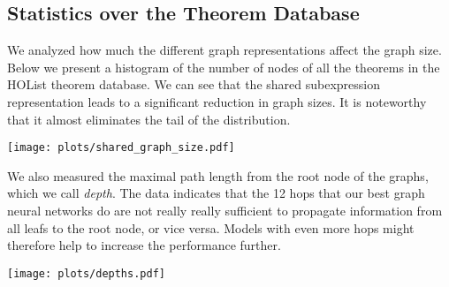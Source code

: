 \documentclass[letterpaper]{article} \usepackage{aaai20}  \usepackage{times}  \usepackage{helvet} \usepackage{courier}  \usepackage[hyphens]{url}  \usepackage{graphicx} \urlstyle{rm} \def\UrlFont{\rm}  \usepackage{graphicx}  \frenchspacing  \setlength{\pdfpagewidth}{8.5in}  \setlength{\pdfpageheight}{11in}
\begin{document}
\subsection{Statistics over the Theorem Database}
\label{sec:graph-stats}

We analyzed how much the different graph representations affect the graph size. 
Below we present a histogram of the number of nodes of all the theorems in the HOList theorem database. We can see that the shared subexpression representation leads to a significant reduction in graph sizes. It is noteworthy that it almost eliminates the tail of the distribution.

\texttt{[image: plots/shared\_graph\_size.pdf]}

We also measured the maximal path length from the root node of the graphs, which we call \emph{depth}.
The data indicates that the 12 hops that our best graph neural networks do are not really really sufficient to propagate information from all leafs to the root node, or vice versa.
Models with even more hops might therefore help to increase the performance further.

\texttt{[image: plots/depths.pdf]} 
\end{document}

